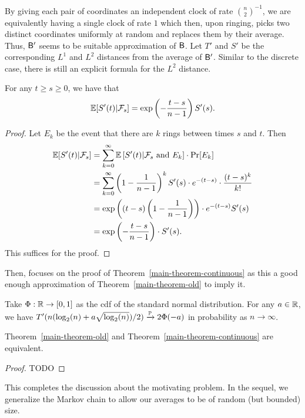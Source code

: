 \documentclass[12pt]{article}
\begin{document}
By giving each pair of coordinates an independent clock of rate $\binom{n}{2}^{-1}$, we are equivalently having a single clock of rate $1$ which then, upon ringing, picks two distinct coordinates uniformly at random and replaces them by their average. Thus, $\mathsf{B}'$ seems to be suitable approximation of $\mathsf{B}$. Let $T'$ and $S'$ be the corresponding $L^1$ and $L^2$ distances from the average of $\mathsf{B}'$. Similar to the discrete case, there is still an explicit formula for the $L^2$ distance.

\begin{prop}
	For any $t \geq s \geq 0$, we have that 
	\[
		\mathbb{E}[S'(t) | \mathcal{F}_s ] = \exp \left ( - \frac{t-s}{n-1} \right ) S'(s).	
	\]
\end{prop}
\begin{proof}
	Let $E_k$ be the event that there are $k$ rings between times $s$ and $t$. Then 
	\begin{align*}
		\mathbb{E} [ S'(t) | \mathcal{F}_s ] & = \sum_{k = 0}^\infty \mathbb{E} \left [ S'(t) | \mathcal{F}_s \text{ and } E_k \right ] \cdot \Pr[E_k] \\
		& = \sum_{k = 0}^\infty \left ( 1 - \frac{1}{n-1} \right )^k S'(s) \cdot e^{-(t-s)} \cdot \frac{(t-s)^k}{k!} \\
		& = \exp \left (  (t-s) \left ( 1 - \frac{1}{n-1} \right ) \right ) \cdot e^{-(t-s)} S'(s) \\
		& = \exp \left ( - \frac{t-s}{n-1} \right ) \cdot S'(s). 
	\end{align*}
	This suffices for the proof. 
\end{proof}

Then, \cite{chatterjee2021phase} focuses on the proof of Theorem~\ref{main-theorem-continuous} as this a good enough approximation of Theorem~\ref{main-theorem-old} to imply it. 

\begin{thm} \label{main-theorem-continuous}
	Take $\Phi : \mathbb{R} \to [0, 1]$ as the cdf of the standard normal distribution. For any $a \in \mathbb{R}$, we have $T'(n (\log_2(n) +a \sqrt{\log_2(n)})/2) \xrightarrow[]{\mathbb{P}} 2 \Phi(-a)$ in probability as $n \to \infty$. 
\end{thm}

\begin{prop}
	Theorem~\ref{main-theorem-old} and Theorem~\ref{main-theorem-continuous} are equivalent. 
\end{prop}
\begin{proof}
	TODO
\end{proof}

This completes the discussion about the motivating problem. In the sequel, we generalize the Markov chain to allow our averages to be of random (but bounded) size.  
\end{document}

